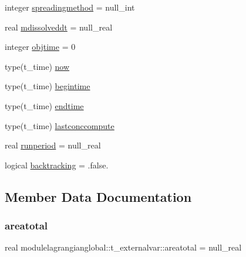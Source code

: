 \begin{DoxyCompactItemize}
\item 
integer \mbox{\hyperlink{structmodulelagrangianglobal_1_1t__externalvar_ad358d569de69c8eb970c4632e8622c2d}{spreadingmethod}} = null\+\_\+int
\item 
real \mbox{\hyperlink{structmodulelagrangianglobal_1_1t__externalvar_a861e89a20d54360b8f9ca50a94d8fd42}{mdissolveddt}} = null\+\_\+real
\item 
integer \mbox{\hyperlink{structmodulelagrangianglobal_1_1t__externalvar_a5809c11c5707b8d8dcfef76d1ec8b7ef}{objtime}} = 0
\item 
type(t\+\_\+time) \mbox{\hyperlink{structmodulelagrangianglobal_1_1t__externalvar_aae9faf557ead03f6ea3efb65433e315b}{now}}
\item 
type(t\+\_\+time) \mbox{\hyperlink{structmodulelagrangianglobal_1_1t__externalvar_a78b59e793f5f1facc987c4d2511bc523}{begintime}}
\item 
type(t\+\_\+time) \mbox{\hyperlink{structmodulelagrangianglobal_1_1t__externalvar_a291d1e51449d7f606b9dc22f1357a091}{endtime}}
\item 
type(t\+\_\+time) \mbox{\hyperlink{structmodulelagrangianglobal_1_1t__externalvar_af319537ac568eb34eba4316cfafd0c6a}{lastconccompute}}
\item 
real \mbox{\hyperlink{structmodulelagrangianglobal_1_1t__externalvar_a602615baf6dd99b4b29661a063656e52}{runperiod}} = null\+\_\+real
\item 
logical \mbox{\hyperlink{structmodulelagrangianglobal_1_1t__externalvar_a9dd0fd42f27c19efc1b03b648f0ba443}{backtracking}} = .false.
\end{DoxyCompactItemize}


\subsection{Member Data Documentation}
\mbox{\label{structmodulelagrangianglobal_1_1t__externalvar_a46f6501e4669329516dd34e53e99fef7}} 
\subsubsection{\texorpdfstring{areatotal}{areatotal}}
{\footnotesize\ttfamily real modulelagrangianglobal\+::t\+\_\+externalvar\+::areatotal = null\+\_\+real\hspace{0.3cm}{\ttfamily [private]}}

